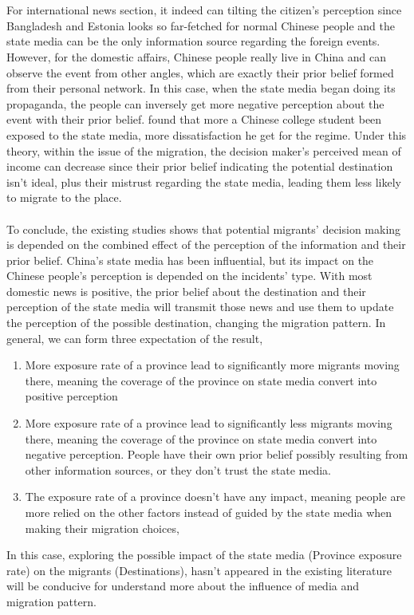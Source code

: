 \documentclass{article}
\begin{document}
\\~\\
For international news section, it indeed can tilting the citizen's perception since Bangladesh and  Estonia looks so far-fetched for normal Chinese people and the state media can be the only information source regarding the foreign events. However, for the domestic affairs, Chinese people really live in China and can observe the event from other angles, which are exactly their prior belief formed from their personal network. In this case, when the state media began doing its propaganda, the people can inversely get more negative perception about the event with their prior belief. \textcite{Huang:2015ps} found that more a Chinese college student been exposed to the state media, more dissatisfaction he get for the regime. Under this theory, within the issue of the migration, the decision maker's perceived mean of income can decrease since their prior belief indicating the potential destination isn't ideal, plus their mistrust regarding the state media, leading them less likely to migrate to the place.
\\~\\
To conclude, the existing studies shows that potential migrants' decision making is depended on the combined effect of the perception of the information and their prior belief. China's state media has been influential, but its impact on the Chinese people's perception is depended on the incidents' type. With most domestic news is positive, the prior belief about the destination and their perception of the state media will transmit those news and use them to update the perception of the possible destination, changing the migration pattern. In general,  we can form three expectation of the result,

\begin{enumerate}
    \item More exposure rate of a province lead to significantly more migrants moving there, meaning the coverage of the province on state media convert into positive perception
    \item  More exposure rate of a province lead to significantly less migrants moving there, meaning the coverage of the province on state media convert into negative perception. People have their own prior belief possibly resulting from other information sources,  or they don't trust the state media.
    \item The exposure rate of a province doesn't have any impact, meaning people are more relied on the other factors instead of guided by the state media when making their migration choices,
\end{enumerate}
In this case, exploring the possible impact of the state media (Province exposure rate) on the migrants (Destinations), hasn't appeared in the existing literature will be conducive for understand more about the influence of media and migration pattern.
\end{document}
